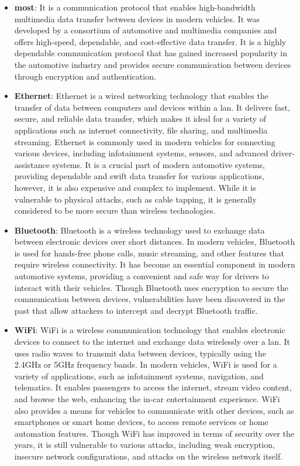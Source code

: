 \begin{itemize}
    \item \textbf{\acrlong{most}}: It is a communication protocol that enables high-bandwidth multimedia data transfer between devices in modern vehicles. 
    It was developed by a consortium of automotive and multimedia companies and offers high-speed, dependable, and cost-effective data transfer.
    It is a highly dependable communication protocol that has gained increased popularity in the automotive industry and
    provides secure communication between devices through encryption and authentication.

    \item \textbf{Ethernet}: Ethernet is a wired networking technology that enables the transfer of data between computers and devices within a \acrshort{lan}.
    It delivers fast, secure, and reliable data transfer, which makes it ideal for a variety of applications such as internet connectivity, file sharing, and multimedia streaming.
    Ethernet is commonly used in modern vehicles for connecting various devices, including infotainment systems, sensors, and advanced driver-assistance systems. 
    It is a crucial part of modern automotive systems, providing dependable and swift data transfer for various applications, however, it is also expensive and complex to implement.
    While it is vulnerable to physical attacks, such as cable tapping, it is generally considered to be more secure than wireless technologies.

    \item \textbf{Bluetooth}: Bluetooth is a wireless technology used to exchange data between electronic devices over short distances.
    In modern vehicles, Bluetooth is used for hands-free phone calls, music streaming, and other features that require wireless connectivity. 
    It has become an essential component in modern automotive systems, providing a convenient and safe way for drivers to interact with their vehicles.
    Though Bluetooth uses encryption to secure the communication between devices, vulnerabilities have been discovered in the past that allow attackers to intercept and decrypt Bluetooth traffic.

    \item \textbf{WiFi}: WiFi is a wireless communication technology that enables electronic devices to connect to the internet and exchange data wirelessly over a \acrshort{lan}.
    It uses radio waves to transmit data between devices, typically using the 2.4GHz or 5GHz frequency bands.
    In modern vehicles, WiFi is used for a variety of applications, such as infotainment systems, navigation, and telematics. 
    It enables passengers to access the internet, stream video content, and browse the web, enhancing the in-car entertainment experience. 
    WiFi also provides a means for vehicles to communicate with other devices, such as smartphones or smart home devices, to access remote services or home automation features.
    Though WiFi has improved in terms of security over the years, it is still vulnerable to various attacks, including weak encryption, insecure network configurations, and attacks on the wireless network itself.
    

\end{itemize}

